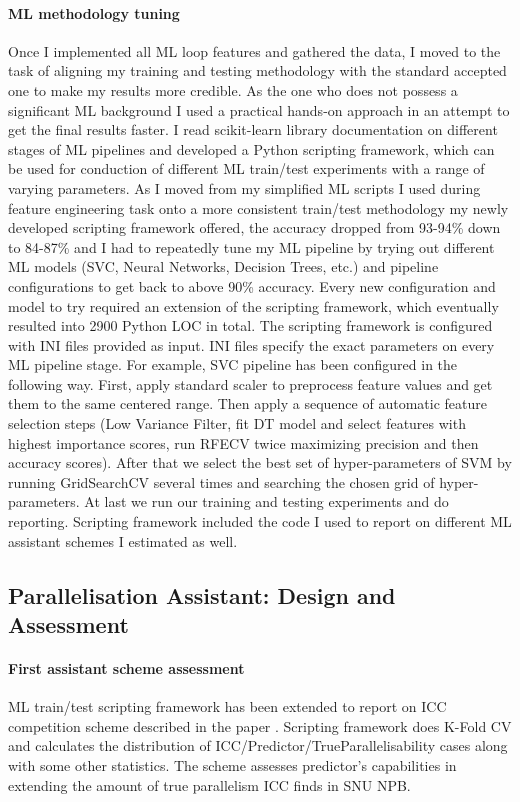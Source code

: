 \documentclass[10pt,a4paper]{report}
\begin{document}
\paragraph{ML methodology tuning}
Once I implemented all ML loop features and gathered the data, I moved to the task of aligning my training and testing methodology with the standard accepted one to make my results more credible. As the one who does not possess a significant ML background I used a practical hands-on approach in an attempt to get the final results faster. I read scikit-learn library \cite{scikit-learn} documentation on different stages of ML pipelines and developed a Python scripting framework, which can be used for conduction of different ML train/test experiments with a range of varying parameters. As I moved from my simplified ML scripts I used during feature engineering task onto a more consistent train/test methodology my newly developed scripting framework offered, the accuracy dropped from 93-94\% down to 84-87\% and I had to repeatedly tune my ML pipeline by trying out different ML models (SVC, Neural Networks, Decision Trees, etc.) and pipeline configurations to get back to above 90\% accuracy. Every new configuration and model to try required an extension of the scripting framework, which eventually resulted into 2900 Python LOC in total. The scripting framework is configured with INI files provided as input. INI files specify the exact parameters on every ML pipeline stage. For example, SVC pipeline has been configured in the following way. First, apply standard scaler to preprocess feature values and get them to the same centered range. Then apply a sequence of automatic feature selection steps (Low Variance Filter, fit DT model and select features with highest importance scores, run RFECV twice maximizing precision and then accuracy scores). After that we select the best set of hyper-parameters of SVM by running GridSearchCV several times and searching the chosen grid of hyper-parameters. At last we run our training and testing experiments and do reporting. Scripting framework included the code I used to report on different ML assistant schemes I estimated as well.

\subsection{Parallelisation Assistant: Design and Assessment}

\paragraph{First assistant scheme assessment}
ML train/test scripting framework has been extended to report on ICC competition scheme described in the paper \cite{aiseps}. Scripting framework does K-Fold CV and calculates the distribution of ICC/Predictor/TrueParallelisability cases along with some other statistics. The scheme assesses predictor's capabilities in extending the amount of true parallelism ICC finds in SNU NPB.
\end{document}
